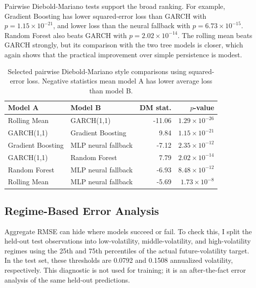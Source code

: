 \documentclass{article}
\begin{document}
Pairwise Diebold-Mariano tests support the broad ranking. For example, Gradient Boosting has lower squared-error loss than GARCH with $p=1.15\times 10^{-21}$, and lower loss than the neural fallback with $p=6.73\times 10^{-15}$. Random Forest also beats GARCH with $p=2.02\times 10^{-14}$. The rolling mean beats GARCH strongly, but its comparison with the two tree models is closer, which again shows that the practical improvement over simple persistence is modest.

\begin{table}[t]
  \centering
  \caption{Selected pairwise Diebold-Mariano style comparisons using squared-error loss. Negative statistics mean model A has lower average loss than model B.}
  \label{tab:dm}
  \begin{tabular}{llrr}
    \toprule
    Model A & Model B & DM stat. & $p$-value \\
    \midrule
    Rolling Mean & GARCH(1,1) & -11.06 & $1.29\times 10^{-26}$ \\
    GARCH(1,1) & Gradient Boosting & 9.84 & $1.15\times 10^{-21}$ \\
    Gradient Boosting & MLP neural fallback & -7.12 & $2.35\times 10^{-12}$ \\
    GARCH(1,1) & Random Forest & 7.79 & $2.02\times 10^{-14}$ \\
    Random Forest & MLP neural fallback & -6.93 & $8.48\times 10^{-12}$ \\
    Rolling Mean & MLP neural fallback & -5.69 & $1.73\times 10^{-8}$ \\
    \bottomrule
  \end{tabular}
\end{table}

\subsection{Regime-Based Error Analysis}
Aggregate RMSE can hide where models succeed or fail. To check this, I split the held-out test observations into low-volatility, middle-volatility, and high-volatility regimes using the 25th and 75th percentiles of the actual future-volatility target. In the test set, these thresholds are 0.0792 and 0.1508 annualized volatility, respectively. This diagnostic is not used for training; it is an after-the-fact error analysis of the same held-out predictions.
\end{document}
